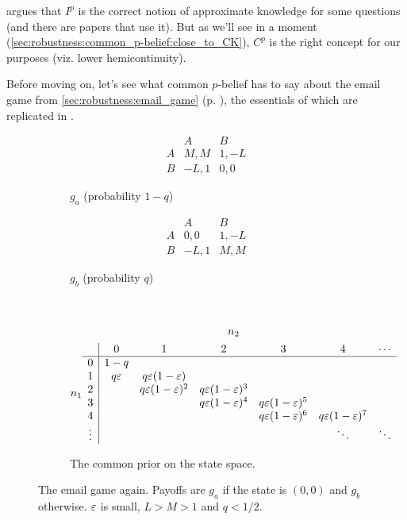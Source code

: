\documentclass[11pt,letterpaper,reqno,oneside]{article}
\begin{document}
\textcite{Morris1999} argues that $I^p$ is the correct notion of approximate knowledge for some questions (and there are papers that use it). But as we'll see in a moment (\cref{sec:robustness:common_p-belief:close_to_CK}), $C^p$ is the right concept for our purposes (viz. lower hemicontinuity).


Before moving on, let's see what common $p$-belief has to say about the email game from \cref{sec:robustness:email_game} (p. \pageref{sec:robustness:email_game}), the essentials of which are replicated in .
%
\begin{figure}
	\begin{subfigure}{0.5\textwidth}
		\begin{equation*}
			\begin{array}{c|cc}
					& A		& B		\\ \hline
				A	& M,M	& 1,-L	\\
				B	& -L,1	& 0,0	
			\end{array}
		\end{equation*}
		\caption{$g_a$ (probability $1-q$)}
	\end{subfigure}
	\begin{subfigure}{0.5\textwidth}
		\begin{equation*}
			\begin{array}{c|cc}
					& A		& B		\\ \hline
				A	& 0,0	& 1,-L	\\
				B	& -L,1	& M,M	
			\end{array}
		\end{equation*}
		\caption{$g_b$ (probability $q$)}
	\end{subfigure}
	\\
	\begin{subfigure}{\textwidth}
		\begin{gather*}
			n_2\\n_1
			\begin{array}{c|ccccccc}
						& 0			& 1					& 2					& 3					& 4					& \cdots	\\ \hline
				0		& 1-q		& 					& 					& 					& 					& 			\\
				1		& q \varepsilon	& q \varepsilon(1-\varepsilon)	& 					& 					& 					& 			\\
				2		& 			& q \varepsilon(1-\varepsilon)^2	& q \varepsilon(1-\varepsilon)^3	& 					& 					& 			\\
				3		& 			& 					& q \varepsilon(1-\varepsilon)^4	& q \varepsilon(1-\varepsilon)^5	& 					& 			\\
				4		& 			& 					& 					& q \varepsilon(1-\varepsilon)^6	& q \varepsilon(1-\varepsilon)^7	& 			\\
				\vdots	& 			& 					& 					& 					& \ddots			& \ddots
			\end{array}
		\end{gather*}
		\caption{The common prior on the state space.}
	\end{subfigure}
	\caption{The email game again. Payoffs are $g_a$ if the state is $(0,0)$ and $g_b$ otherwise. $\varepsilon$ is small, $L>M>1$ and $q<1/2$.}
	\label{fig:email_game_recap}
\end{figure}
\end{document}
